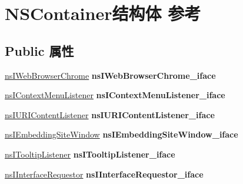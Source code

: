 \hypertarget{struct_n_s_container}{}\section{N\+S\+Container结构体 参考}
\label{struct_n_s_container}
\subsection*{Public 属性}
\begin{DoxyCompactItemize}
\item 
\mbox{\label{struct_n_s_container_a430834010e765798c53876d1e5f2cb22}} 
\hyperlink{interfacens_i_web_browser_chrome}{ns\+I\+Web\+Browser\+Chrome} {\bfseries ns\+I\+Web\+Browser\+Chrome\+\_\+iface}
\item 
\mbox{\label{struct_n_s_container_a6710c71abab41d72b1845c70ba7b9cc9}} 
\hyperlink{interfacens_i_context_menu_listener}{ns\+I\+Context\+Menu\+Listener} {\bfseries ns\+I\+Context\+Menu\+Listener\+\_\+iface}
\item 
\mbox{\label{struct_n_s_container_a2542271cc573c399189a01c22b3e3afe}} 
\hyperlink{interfacens_i_u_r_i_content_listener}{ns\+I\+U\+R\+I\+Content\+Listener} {\bfseries ns\+I\+U\+R\+I\+Content\+Listener\+\_\+iface}
\item 
\mbox{\label{struct_n_s_container_aaadef40bbc30bad08e4540b1ff059124}} 
\hyperlink{interfacens_i_embedding_site_window}{ns\+I\+Embedding\+Site\+Window} {\bfseries ns\+I\+Embedding\+Site\+Window\+\_\+iface}
\item 
\mbox{\label{struct_n_s_container_acbf464dd226f3c1a7015132f2afb1844}} 
\hyperlink{interfacens_i_tooltip_listener}{ns\+I\+Tooltip\+Listener} {\bfseries ns\+I\+Tooltip\+Listener\+\_\+iface}
\item 
\mbox{\label{struct_n_s_container_a7f13a1719ffa85987193e6f3f2f54cdb}} 
\hyperlink{interfacens_i_interface_requestor}{ns\+I\+Interface\+Requestor} {\bfseries ns\+I\+Interface\+Requestor\+\_\+iface}
\item 
\mbox{\label{struct_n_s_container_a11f042decfb0d5e24ac9eaa6db3be8b1}} 

\end{DoxyCompactItemize}
